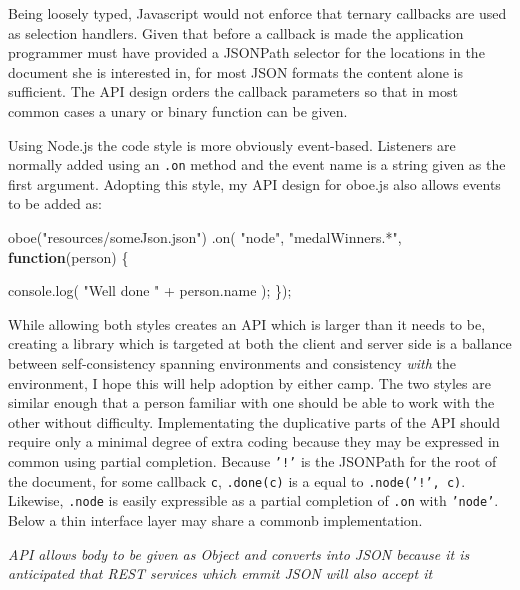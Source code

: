 \documentclass[]{article}
\newenvironment{Shaded}{}{}
\newcommand{\KeywordTok}[1]{\textcolor[rgb]{0.00,0.44,0.13}{\textbf{{#1}}}}
\newcommand{\StringTok}[1]{\textcolor[rgb]{0.25,0.44,0.63}{{#1}}}
\newcommand{\OtherTok}[1]{\textcolor[rgb]{0.00,0.44,0.13}{{#1}}}
\newcommand{\FunctionTok}[1]{\textcolor[rgb]{0.02,0.16,0.49}{{#1}}}
\newcommand{\NormalTok}[1]{{#1}}
\begin{document}
Being loosely typed, Javascript would not enforce that ternary callbacks
are used as selection handlers. Given that before a callback is made the
application programmer must have provided a JSONPath selector for the
locations in the document she is interested in, for most JSON formats
the content alone is sufficient. The API design orders the callback
parameters so that in most common cases a unary or binary function can
be given.

Using Node.js the code style is more obviously event-based. Listeners
are normally added using an \texttt{.on} method and the event name is a
string given as the first argument. Adopting this style, my API design
for oboe.js also allows events to be added as:

\begin{Shaded}
\begin{Highlighting}[]
\FunctionTok{oboe}\NormalTok{(}\StringTok{"resources/someJson.json"}\NormalTok{)}
   \NormalTok{.}\FunctionTok{on}\NormalTok{( }\StringTok{"node"}\NormalTok{, }\StringTok{"medalWinners.*"}\NormalTok{, }\KeywordTok{function}\NormalTok{(person) \{}
   
      \OtherTok{console}\NormalTok{.}\FunctionTok{log}\NormalTok{( }\StringTok{"Well done "} \NormalTok{+ }\OtherTok{person}\NormalTok{.}\FunctionTok{name} \NormalTok{);}
   \NormalTok{\});}
\end{Highlighting}
\end{Shaded}

While allowing both styles creates an API which is larger than it needs
to be, creating a library which is targeted at both the client and
server side is a ballance between self-consistency spanning environments
and consistency \emph{with} the environment, I hope this will help
adoption by either camp. The two styles are similar enough that a person
familiar with one should be able to work with the other without
difficulty. Implementating the duplicative parts of the API should
require only a minimal degree of extra coding because they may be
expressed in common using partial completion. Because \texttt{'!'} is
the JSONPath for the root of the document, for some callback \texttt{c},
\texttt{.done(c)} is a equal to \texttt{.node('!', c)}. Likewise,
\texttt{.node} is easily expressible as a partial completion of
\texttt{.on} with \texttt{'node'}. Below a thin interface layer may
share a commonb implementation.

\emph{API allows body to be given as Object and converts into JSON
because it is anticipated that REST services which emmit JSON will also
accept it}
\end{document}
